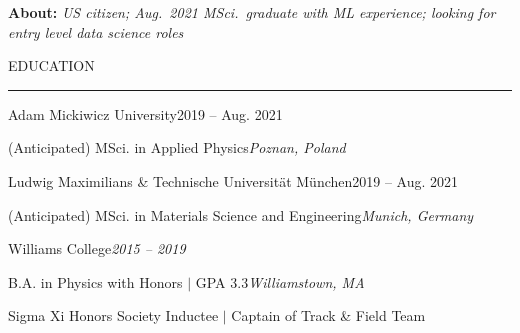 \documentclass{short_resume} %
\renewenvironment{rSection}[1]{
	\sectionskip
	\textcolor{RoyalPurple}{\MakeUppercase{#1}}
	\sectionlineskip
	\hrule
	\begin{list}{}{
			\setlength{\leftmargin}{1.5em}
		}
		\item[]
	}{
	\end{list}
}
\begin{document}
	\vspace{-1em}
	\textbf{ About: }\textit{US citizen; Aug.~2021 MSci.~graduate with ML experience; looking for entry level data science roles}
	\vspace{-1em}
	
	\begin{rSection}{Education} 

		\begin{rSubsection}{Adam Mickiwicz University}{2019 -- Aug. 2021}{}{}
			\vspace{-.2em}
			\item[] {(Anticipated) MSci. in Applied Physics}\hfill{\em Poznan, Poland}
		\end{rSubsection}
	\vspace{-.5em}
		\begin{rSubsection}{Ludwig Maximilians \& Technische Universit{\"a}t M{\"u}nchen}{2019 -- Aug. 2021}{}{}
		\vspace{-.2em}
		\item[] {(Anticipated) MSci. in Materials Science and Engineering}\hfill{\em Munich, Germany}
		\end{rSubsection}
	\vspace{-.4em}
		\begin{rSubsection}{Williams College}{\em 2015 -- 2019}{}{}
			\vspace{-.2em}
			\item[] {B.A. in Physics with Honors $\vert$ GPA 3.3}\hfill{\em Williamstown, MA}
			\item[] Sigma Xi Honors Society Inductee $\vert$ Captain of Track \& Field Team	
		\end{rSubsection}
	\end{rSection}
		
\end{document}

